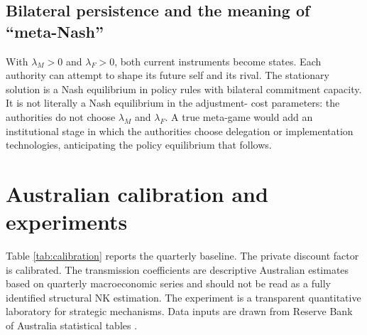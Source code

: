 \documentclass[11pt]{article}
\begin{document}
\subsection{Bilateral persistence and the meaning of ``meta-Nash''}

With $\lambda_M>0$ and $\lambda_F>0$, both current instruments become states.
Each authority can attempt to shape its future self and its rival. The
stationary solution is a Nash equilibrium in policy rules with bilateral
commitment capacity. It is not literally a Nash equilibrium in the adjustment-
cost parameters: the authorities do not choose $\lambda_M$ and $\lambda_F$.
A true meta-game would add an institutional stage in which the authorities
choose delegation or implementation technologies, anticipating the policy
equilibrium that follows.

\section{Australian calibration and experiments}
\label{sec:calibration}

Table \ref{tab:calibration} reports the quarterly baseline. The private
discount factor is calibrated. The transmission coefficients are descriptive
Australian estimates based on quarterly macroeconomic series and should not be
read as a fully identified structural NK estimation. The experiment is a
transparent quantitative laboratory for strategic mechanisms. Data inputs are
drawn from Reserve Bank of Australia statistical tables \citep{RBAData}.
\end{document}
